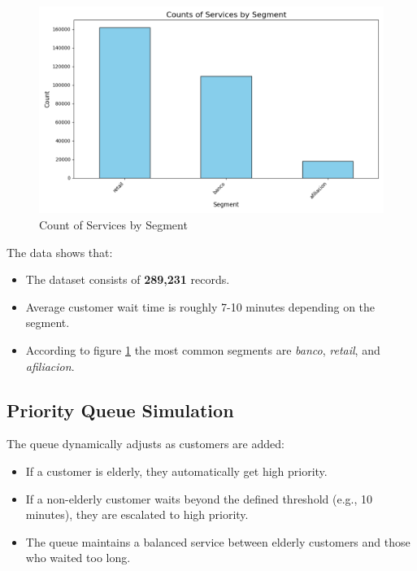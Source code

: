 \documentclass[twoside]{article}
\begin{document}
\begin{figure}[H]
  \centering
  \includegraphics[width=1\textwidth]{imgs/segmentCountsPlot.png}
  \caption{Count of Services by Segment}
  \label{fig:2}
\end{figure}

The data shows that:
\begin{itemize}
    \item The dataset consists of \textbf{289,231} records.
    \item Average customer wait time is roughly 7-10 minutes depending on the segment.
    \item According to figure \ref{fig:2} the most common segments are \textit{banco}, \textit{retail}, and \textit{afiliacion}.
\end{itemize}


\subsection*{Priority Queue Simulation}
The queue dynamically adjusts as customers are added:
\begin{itemize}
    \item If a customer is elderly, they automatically get high priority.
    \item If a non-elderly customer waits beyond the defined threshold (e.g., 10 minutes), they are escalated to high priority.
    \item The queue maintains a balanced service between elderly customers and those who waited too long.
\end{itemize}
\end{document}
